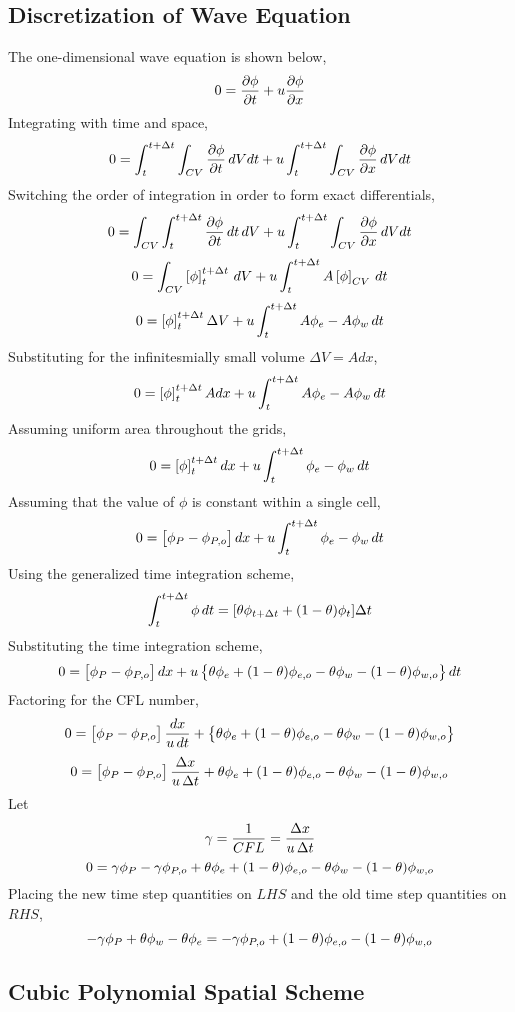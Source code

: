 \documentclass[class=report, 12pt, crop=false]{standalone}
\begin{document}
\begin{center}

\subsection{Discretization of Wave Equation}
\begin{comment}
\end{comment}
The one-dimensional wave equation is shown below,
$$0 = \frac{\partial\phi}{\partial t} + u\frac{\partial\phi}{\partial x}$$
Integrating with time and space,
$$0 = \int^{t+\Delta t}_{t}\int_{CV} \frac{\partial\phi}{\partial t} \,dVdt + u\int^{t+\Delta t}_{t}\int_{CV}\frac{\partial\phi}{\partial x}\,dVdt$$
Switching the order of integration in order to form exact differentials,
$$0 = \int_{CV}\int^{t+\Delta t}_{t} \frac{\partial\phi}{\partial t} \,dt\,dV + u\int^{t+\Delta t}_{t}\int_{CV}\frac{\partial\phi}{\partial x}\,dVdt$$
$$0 = \int_{CV}\left[\phi\right]^{t+\Delta t}_{t} \,dV + u\int^{t+\Delta t}_{t}A\left[\phi\right]_{CV}\,dt$$
$$0 = \left[\phi\right]^{t+\Delta t}_{t}\Delta V  + u\int^{t+\Delta t}_{t}A\phi_{e} - A\phi_{w}\,dt$$
Substituting for the infinitesmially small volume $\Delta V = A dx$,
$$0 = \left[\phi\right]^{t+\Delta t}_{t}A dx  + u\int^{t+\Delta t}_{t}A\phi_{e} - A\phi_{w}\,dt$$
Assuming uniform area throughout the grids,
$$0 = \left[\phi\right]^{t+\Delta t}_{t} dx  + u\int^{t+\Delta t}_{t}\phi_{e} - \phi_{w}\,dt$$
Assuming that the value of $\phi$ is constant within a single cell,
$$0 = \left[\phi_{P} - \phi_{P,o}\right] dx  + u\int^{t+\Delta t}_{t}\phi_{e} - \phi_{w}\,dt$$
Using the generalized time integration scheme,
$$\int^{t+\Delta t}_{t} \phi\,dt = [\theta\phi_{t+\Delta t} + (1-\theta)\phi_{t}]\Delta t$$
Substituting the time integration scheme,
$$0 = \left[\phi_{P} - \phi_{P,o}\right] dx  + u\left\{\theta\phi_{e} + (1-\theta)\phi_{e,o} - \theta\phi_{w} - (1-\theta)\phi_{w,o}\right\}dt$$
Factoring for the CFL number,
$$0 = \left[\phi_{P} - \phi_{P,o}\right] \frac{dx}{u\,dt}  + \left\{\theta\phi_{e} + (1-\theta)\phi_{e,o} - \theta\phi_{w} - (1-\theta)\phi_{w,o}\right\}$$
$$0 = \left[\phi_{P} - \phi_{P,o}\right] \frac{\Delta x}{u\,\Delta t}  + \theta\phi_{e} + (1-\theta)\phi_{e,o} - \theta\phi_{w} - (1-\theta)\phi_{w,o}$$
Let 
$$\gamma = \frac{1}{CFL} = \frac{\Delta x}{u\,\Delta t}$$
$$0 = \gamma\phi_{P} - \gamma\phi_{P,o}   + \theta\phi_{e} + (1-\theta)\phi_{e,o} - \theta\phi_{w} - (1-\theta)\phi_{w,o}$$
Placing the new time step quantities on $LHS$ and the old time step quantities on $RHS$,
$$-\gamma\phi_{P} + \theta\phi_{w} - \theta\phi_{e} = - \gamma\phi_{P,o} + (1-\theta)\phi_{e,o} - (1-\theta)\phi_{w,o}$$
\subsection{Cubic Polynomial Spatial Scheme}
\begin{comment}
\end{comment}


\end{center}
\end{document}
